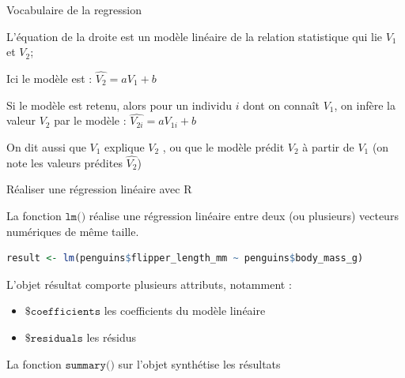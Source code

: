 \documentclass{beamer}
\begin{document}
\begin{frame}{Vocabulaire de la regression}


L'\alert{équation} de la droite  est un \alert{modèle linéaire} de la relation statistique qui lie $V_1$ et $V_2$; 

Ici le modèle est :  $\hat{V_2}=aV_1+b$


 \vspace{0.5cm}


Si le modèle est retenu, alors pour un individu $i$ dont on connaît $V_1$, on infère la valeur $V_2$ par le modèle :    $\hat{V_{2i}} = aV_{1i} +b$
 
 On dit aussi que $V_1$ \alert{explique} $V_2$ , ou que le modèle \alert{prédit} $V_2$ à partir de $V_1$ (on note les valeurs prédites $\hat{V_2}$)
 


\end{frame}




\begin{frame}[fragile]{Réaliser une régression linéaire avec R}


La fonction $\texttt{lm()}$ réalise une régression linéaire entre deux (ou plusieurs) vecteurs numériques de même taille.

\vspace{0.5cm}

\begin{small}
\begin{spacing}{0.75}
\begin{lstlisting}[language=R,basicstyle=\scriptsize\ttfamily, commentstyle=\ttfamily]
 result <- lm(penguins$flipper_length_mm ~ penguins$body_mass_g)
\end{lstlisting}
\end{spacing}
\end{small}



L'objet résultat comporte plusieurs attributs, notamment : 

\begin{itemize}
  \item $\texttt{\$coefficients}$ les coefficients du modèle linéaire
  \item  $\texttt{\$residuals}$ les résidus 
\end{itemize}


La fonction $\texttt{summary()}$ sur l'objet synthétise les résultats 


\end{frame}
\end{document}
